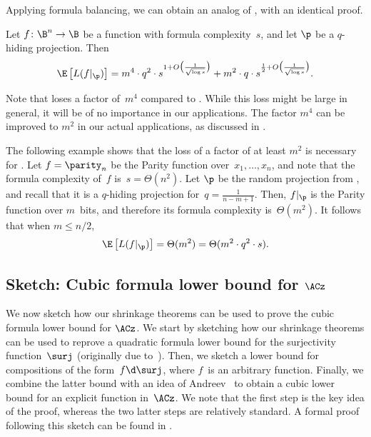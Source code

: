 Applying formula balancing, we can obtain an analog of 
,
with an identical proof. 
\begin{corollary}
\label{cor:shrinkage-without-depth-hiding} Let $f\colon\B^{n}\to\B$
be a function with formula complexity~$s$, and let $\p$ be a $q$-hiding
projection. Then 
\[
\E\left[L(f|_{\p})\right]=m^{4}\cdot q^{2}\cdot s^{1+O\bigl(\frac{1}{\sqrt{\log s}}\bigr)}+m^{2}\cdot q\cdot s^{\frac{1}{2}+O\bigl(\frac{1}{\sqrt{\log s}}\bigr)}.
\]
\end{corollary}

\begin{remark}
Note that  
loses a factor of~$m^{4}$ compared
to . While 
this loss might be large in general,
it will be of no importance in our applications. The factor $m^{4}$
can be improved to $m^{2}$ in our actual applications, as discussed
in %
.  %

The following example shows that the loss of a factor of at least
$m^{2}$ is necessary for . 
Let $f=\parity_{n}$
be the Parity function over~$x_{1},\ldots,x_{n}$, and note that
the formula complexity of~$f$ is~$s=\Theta(n^{2})$. Let $\p$
be the random projection from , and
recall that it is a $q$-hiding projection for~$q=\frac{1}{n-m+1}$.
Then, $f|_{\p}$ is the Parity function over $m$~bits, and therefore
its formula complexity is~$\Theta(m^{2})$. It follows that when
$m\leq n/2$, 
\[
\E\left[L(f|_{\p})\right]=\Theta(m^{2})=\Theta(m^{2}\cdot q^{2}\cdot s).
\]
\end{remark}


\subsection{\label{subsec:application-sketch}Sketch: Cubic formula lower bound
for \texorpdfstring{$\protect\ACz$}{AC0}}

We now sketch how our shrinkage theorems can be used to prove the
cubic formula lower bound for $\ACz$. We start by sketching how our
shrinkage theorems can be used to reprove a quadratic formula lower
bound for the surjectivity function~$\surj$ (originally due to~\cite{BM12}).
Then, we sketch a lower bound for compositions of the form~$f\d\surj$,
where $f$~is an arbitrary function. Finally, we combine the latter
bound with an idea of Andreev~\cite{A87} to obtain a cubic lower
bound for an explicit function in~$\ACz$. We note that the first
step is the key idea of the proof, whereas the two latter steps are
relatively standard. A formal proof following this sketch can be found
in .

